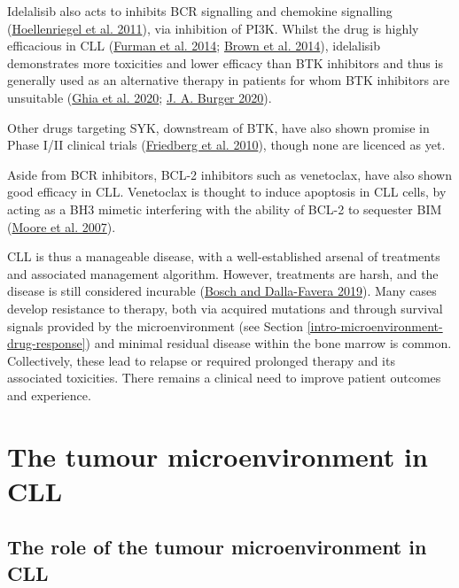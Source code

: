 \documentclass[11pt, a4paper, twosided]{book}
\begin{document}
Idelalisib also acts to inhibits BCR signalling and chemokine signalling (\protect\hyperlink{ref-Hoellenriegel2011}{Hoellenriegel et al. 2011}), via inhibition of PI3K. Whilst the drug is highly efficacious in CLL (\protect\hyperlink{ref-Furman2014}{Furman et al. 2014}; \protect\hyperlink{ref-Brown2014}{Brown et al. 2014}), idelalisib demonstrates more toxicities and lower efficacy than BTK inhibitors and thus is generally used as an alternative therapy in patients for whom BTK inhibitors are unsuitable (\protect\hyperlink{ref-Ghia2020}{Ghia et al. 2020}; \protect\hyperlink{ref-Burger2020}{J. A. Burger 2020}).

Other drugs targeting SYK, downstream of BTK, have also shown promise in Phase I/II clinical trials (\protect\hyperlink{ref-Friedberg2010}{Friedberg et al. 2010}), though none are licenced as yet.

Aside from BCR inhibitors, BCL-2 inhibitors such as venetoclax, have also shown good efficacy in CLL. Venetoclax is thought to induce apoptosis in CLL cells, by acting as a BH3 mimetic interfering with the ability of BCL-2 to sequester BIM (\protect\hyperlink{ref-Moore2007}{Moore et al. 2007}).

CLL is thus a manageable disease, with a well-established arsenal of treatments and associated management algorithm. However, treatments are harsh, and the disease is still considered incurable (\protect\hyperlink{ref-Bosch2019}{Bosch and Dalla-Favera 2019}). Many cases develop resistance to therapy, both via acquired mutations and through survival signals provided by the microenvironment (see Section \ref{intro-microenvironment-drug-response}) and minimal residual disease within the bone marrow is common. Collectively, these lead to relapse or required prolonged therapy and its associated toxicities. There remains a clinical need to improve patient outcomes and experience.

\hypertarget{intro-tumour-microenvironment}{%
\section{The tumour microenvironment in CLL}\label{intro-tumour-microenvironment}}

\hypertarget{intro-tumour-microenvironment-role}{%
\subsection{The role of the tumour microenvironment in CLL}\label{intro-tumour-microenvironment-role}}
\end{document}
